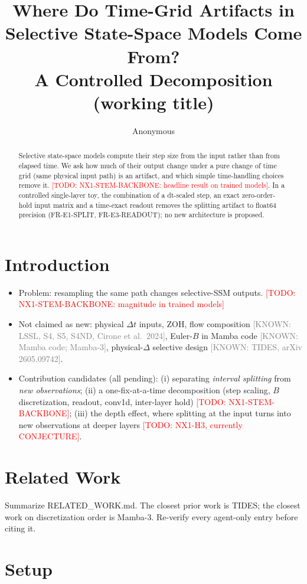 \documentclass{article}
\title{Where Do Time-Grid Artifacts in Selective State-Space Models Come From?\\
\large A Controlled Decomposition (working title)}
\author{Anonymous}
\newcommand{\todo}[1]{\textcolor{red}{[TODO: #1]}}
\newcommand{\known}[1]{\textcolor{gray}{[KNOWN: #1]}}
\begin{document}
\maketitle

\begin{abstract}
Selective state-space models compute their step size from the input rather than
from elapsed time. We ask how much of their output change under a pure change of
time grid (same physical input path) is an artifact, and which simple time-handling
choices remove it. \todo{NX1-STEM-BACKBONE: headline result on trained models}.
In a controlled single-layer toy, the combination of a dt-scaled step, an exact
zero-order-hold input matrix and a time-exact readout removes the splitting
artifact to float64 precision (FR-E1-SPLIT, FR-E3-READOUT); no new architecture is
proposed.
\end{abstract}

\section{Introduction}
\begin{itemize}
  \item Problem: resampling the same path changes selective-SSM outputs. \todo{NX1-STEM-BACKBONE: magnitude in trained models}
  \item Not claimed as new: physical $\Delta t$ inputs, ZOH, flow composition \known{LSSL, S4, S5, S4ND, Cirone et al.\ 2024},
        Euler-$B$ in Mamba code \known{Mamba code; Mamba-3}, physical-$\Delta$ selective design \known{TIDES, arXiv 2605.09742}.
  \item Contribution candidates (all pending):
    (i) separating \emph{interval splitting} from \emph{new observations};
    (ii) a one-fix-at-a-time decomposition (step scaling, $B$ discretization, readout, conv1d, inter-layer hold) \todo{NX1-STEM-BACKBONE};
    (iii) the depth effect, where splitting at the input turns into new observations at deeper layers \todo{NX1-H3, currently CONJECTURE}.
\end{itemize}

\section{Related Work}
Summarize RELATED\_WORK.md. The closest prior work is TIDES; the closest work on discretization order is Mamba-3.
Re-verify every agent-only entry before citing it.

\section{Setup}
\end{document}
